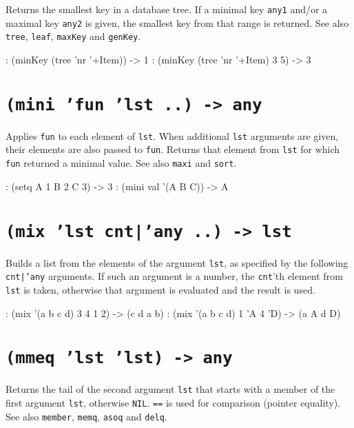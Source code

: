 Returns the smallest key in a database tree. If a minimal key \texttt{any1}
and/or a maximal key \texttt{any2} is given, the smallest key from that range
is returned. See also \texttt{tree}, \texttt{leaf}, \texttt{maxKey} and \texttt{genKey}.


\begin{wideverbatim}
: (minKey (tree 'nr '+Item))
-> 1
: (minKey (tree 'nr '+Item) 3 5)
-> 3
\end{wideverbatim}

 
\section*{\texttt{(mini 'fun 'lst ..) -> any}}
\label{sec:func-ref-M-(mini 'fun 'lst ..) -> any}


Applies \texttt{fun} to each element of \texttt{lst}. When additional \texttt{lst} arguments
are given, their elements are also passed to \texttt{fun}. Returns that element
from \texttt{lst} for which \texttt{fun} returned a minimal value. See also \texttt{maxi} and
\texttt{sort}.


\begin{wideverbatim}
: (setq A 1  B 2  C 3)
-> 3
: (mini val '(A B C))
-> A
\end{wideverbatim}

 
\section*{\texttt{(mix 'lst cnt|'any ..) -> lst}}
\label{sec:func-ref-M-(mix 'lst cnt|'any ..) -> lst}


Builds a list from the elements of the argument \texttt{lst}, as specified by
the following \texttt{cnt|'any} arguments. If such an argument is a number, the
\texttt{cnt}'th element from \texttt{lst} is taken, otherwise that argument is
evaluated and the result is used.


\begin{wideverbatim}
: (mix '(a b c d) 3 4 1 2)
-> (c d a b)
: (mix '(a b c d) 1 'A 4 'D)
-> (a A d D)
\end{wideverbatim}

 
\section*{\texttt{(mmeq 'lst 'lst) -> any}}
\label{sec:func-ref-M-(mmeq 'lst 'lst) -> any}


Returns the tail of the second argument \texttt{lst} that starts with a member
of the first argument \texttt{lst}, otherwise \texttt{NIL}. \texttt{==} is used for
comparison (pointer equality). See also \texttt{member}, \texttt{memq}, \texttt{asoq} and
\texttt{delq}.


